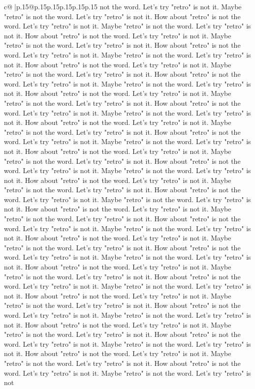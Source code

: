 \documentclass{article}
\begin{document}
{\begin{supertabular}{c@{$\;$}|p{.15\linewidth}@{}p{.15\linewidth}p{.15\linewidth}p{.15\linewidth}p{.15\linewidth}p{.15\linewidth}}
{{{not the word. Let's try "retro" is not it. Maybe "retro" is not the word. Let's try "retro" is not it. How about "retro" is not the word. Let's try "retro" is not it. Maybe "retro" is not the word. Let's try "retro" is not it. How about "retro" is not the word. Let's try "retro" is not it. Maybe "retro" is not the word. Let's try "retro" is not it. How about "retro" is not the word. Let's try "retro" is not it. Maybe "retro" is not the word. Let's try "retro" is not it. How about "retro" is not the word. Let's try "retro" is not it. Maybe "retro" is not the word. Let's try "retro" is not it. How about "retro" is not the word. Let's try "retro" is not it. Maybe "retro" is not the word. Let's try "retro" is not it. How about "retro" is not the word. Let's try "retro" is not it. Maybe "retro" is not the word. Let's try "retro" is not it. How about "retro" is not the word. Let's try "retro" is not it. Maybe "retro" is not the word. Let's try "retro" is not it. How about "retro" is not the word. Let's try "retro" is not it. Maybe "retro" is not the word. Let's try "retro" is not it. How about "retro" is not the word. Let's try "retro" is not it. Maybe "retro" is not the word. Let's try "retro" is not it. How about "retro" is not the word. Let's try "retro" is not it. Maybe "retro" is not the word. Let's try "retro" is not it. How about "retro" is not the word. Let's try "retro" is not it. Maybe "retro" is not the word. Let's try "retro" is not it. How about "retro" is not the word. Let's try "retro" is not it. Maybe "retro" is not the word. Let's try "retro" is not it. How about "retro" is not the word. Let's try "retro" is not it. Maybe "retro" is not the word. Let's try "retro" is not it. How about "retro" is not the word. Let's try "retro" is not it. Maybe "retro" is not the word. Let's try "retro" is not it. How about "retro" is not the word. Let's try "retro" is not it. Maybe "retro" is not the word. Let's try "retro" is not it. How about "retro" is not the word. Let's try "retro" is not it. Maybe "retro" is not the word. Let's try "retro" is not it. How about "retro" is not the word. Let's try "retro" is not it. Maybe "retro" is not the word. Let's try "retro" is not it. How about "retro" is not the word. Let's try "retro" is not it. Maybe "retro" is not the word. Let's try "retro" is not it. How about "retro" is not the word. Let's try "retro" is not it. Maybe "retro" is not the word. Let's try "retro" is not it. How about "retro" is not the word. Let's try "retro" is not it. Maybe "retro" is not the word. Let's try "retro" is not it. How about "retro" is not the word. Let's try "retro" is not it. Maybe "retro" is not the word. Let's try "retro" is not it. How about "retro" is not the word. Let's try "retro" is not it. Maybe "retro" is not the word. Let's try "retro" is not it. How about "retro" is not the word. Let's try "retro" is not it. Maybe "retro" is not the word. Let's try "retro" is not it. How about "retro" is not the word. Let's try "retro" is not it. Maybe "retro" is not the word. Let's try "retro" is not it. How about "retro" is not the word. Let's try "retro" is not it. Maybe "retro" is not the word. Let's try "retro" is not }}}
\end{supertabular}}
\end{document}
